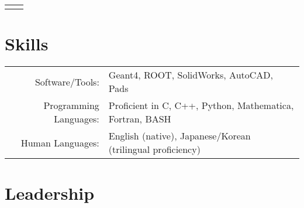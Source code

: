 \documentclass[11pt]{article} %
\begin{document}
\begin{tabularx}{\linewidth}{@{}lR@{}}
{\begin{minipage}[t]{\linewidth}
\begin{itemize}
		\end{itemize}
	\end{minipage}}\\
\end{tabularx}


\section{Skills}

\noindent\begin{tabularx}{\linewidth}{@{}rl}
	Software/Tools: & Geant4, ROOT, SolidWorks, AutoCAD, Pads\\
	Programming Languages: & Proficient in C, C++, Python, Mathematica, Fortran, BASH\\
	Human Languages: & English (native), Japanese/Korean (trilingual proficiency)\\
\end{tabularx}


\section{Leadership}
\end{document}
